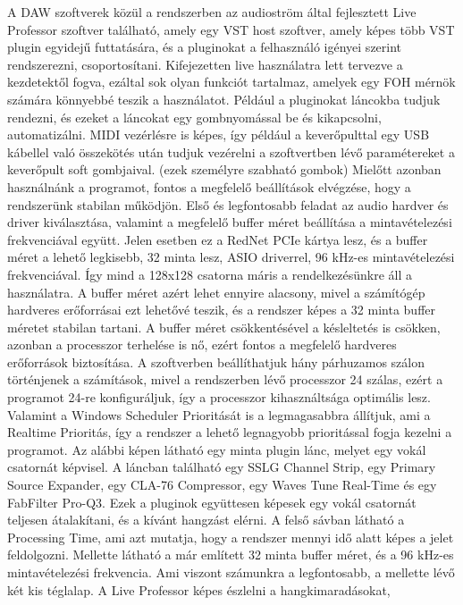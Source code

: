 A DAW szoftverek közül a rendszerben az audioström által fejlesztett Live Professor szoftver található, amely egy
VST host szoftver, amely képes több VST plugin egyidejű futtatására, és a pluginokat a felhasználó igényei szerint
rendszerezni, csoportosítani. Kifejezetten live használatra lett tervezve a kezdetektől fogva, ezáltal sok olyan
funkciót tartalmaz, amelyek egy FOH mérnök számára könnyebbé teszik a használatot. Például a pluginokat láncokba tudjuk
rendezni, és ezeket a láncokat egy gombnyomással be és kikapcsolni, automatizálni. MIDI vezérlésre is képes, így
például a keverőpulttal egy USB kábellel való összekötés után tudjuk vezérelni a szoftvertben lévő paramétereket a keverőpult soft gombjaival. (ezek személyre szabható gombok)
Mielőtt azonban használnánk a programot, fontos a megfelelő beállítások elvégzése, hogy a rendszerünk stabilan működjön.
Első és legfontosabb feladat az audio hardver és driver kiválasztása, valamint a megfelelő buffer méret beállítása a mintavételezési frekvenciával együtt.
Jelen esetben ez a RedNet PCIe kártya lesz, és a buffer méret a lehető legkisebb, 32 minta lesz, ASIO driverrel, 96 kHz-es mintavételezési frekvenciával.
Így mind a 128x128 csatorna máris a rendelkezésünkre áll a használatra.
A buffer méret azért lehet ennyire alacsony, mivel a számítógép hardveres erőforrásai ezt lehetővé teszik, és a rendszer
képes a 32 minta buffer méretet stabilan tartani. A buffer méret csökkentésével a késleltetés is csökken, 
azonban a processzor terhelése is nő, ezért fontos a megfelelő hardveres erőforrások biztosítása. 
A szoftverben beállíthatjuk hány párhuzamos szálon történjenek a számítások, mivel a rendszerben lévő processzor 24 szálas,
ezért a programot 24-re konfiguráljuk, így a processzor kihasználtsága optimális lesz. Valamint a Windows Scheduler Prioritását is
a legmagasabbra állítjuk, ami a Realtime Prioritás, így a rendszer a lehető legnagyobb prioritással fogja kezelni a programot.
Az alábbi képen látható egy minta plugin lánc, melyet egy vokál csatornát képvisel. A láncban található egy
SSLG Channel Strip, egy Primary Source Expander, egy CLA-76 Compressor, egy Waves Tune Real-Time és egy FabFilter Pro-Q3.
Ezek a pluginok együttesen képesek egy vokál csatornát teljesen átalakítani, és a kívánt hangzást elérni.
A felső sávban látható a Processing Time, ami azt mutatja, hogy a rendszer mennyi idő alatt képes a jelet feldolgozni.
Mellette látható a már említett 32 minta buffer méret, és a 96 kHz-es mintavételezési frekvencia.
Ami viszont számunkra a legfontosabb, a mellette lévő két kis téglalap. A Live Professor képes észlelni a hangkimaradásokat,
